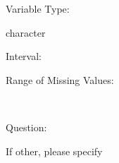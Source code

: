 \documentclass[
]{article}
\begin{document}
\begin{minipage}[t]{0.3\linewidth}

Variable Type:

\end{minipage}%
\begin{minipage}[t]{0.7\linewidth}

character

\end{minipage}

\begin{minipage}[t]{0.3\linewidth}

Interval:

\end{minipage}%
\begin{minipage}[t]{0.7\linewidth}

\end{minipage}

\begin{minipage}[t]{0.3\linewidth}

Range of Missing Values:

\end{minipage}%
\begin{minipage}[t]{0.7\linewidth}

~

\end{minipage}

\begin{minipage}[t]{0.3\linewidth}

Question:

\end{minipage}%
\begin{minipage}[t]{0.7\linewidth}

If other, please specify

\end{minipage}
\end{document}
